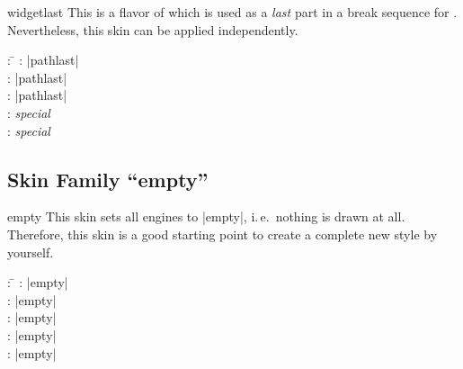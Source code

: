 \clearpage
\begin{docSkin}{widgetlast}
This is a flavor of  which is used as a \emph{last} part
in a break sequence for .
Nevertheless, this skin can be applied independently.
\begin{tcolorbox}[skintable=widgetlast]
  \begin{tabbing}
    : \=\kill
    :           \> |pathlast|\\
    : \> |pathlast|\\ 
    :        \> |pathlast|\\
    :    \> \emph{special}\\
    :           \> \emph{special}
  \end{tabbing}
\end{tcolorbox}
\end{docSkin}


\begin{dispExample}
\end{dispExample}


\clearpage
\subsection{Skin Family \enquote{empty}}

\begin{docSkin}{empty}
  This skin sets all engines to |empty|, i.\,e.\ nothing is drawn at all.
  Therefore, this skin is a good starting point to create a complete
  new style by yourself.
\begin{tcolorbox}[skintable=empty]
  \begin{tabbing}
    : \=\kill
    :           \> |empty|\\
    : \> |empty|\\ 
    :        \> |empty|\\
    :    \> |empty|\\
    :           \> |empty|
  \end{tabbing}
\end{tcolorbox}
\end{docSkin}


